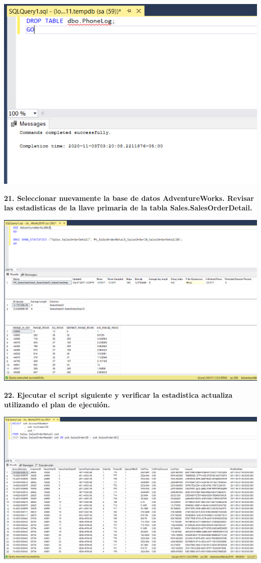 \documentclass{article}
\begin{document}
    \begin{center}
		\includegraphics[width=15cm]{./images/24} 
	\end{center}
\newpage
\textbf{21. Seleccionar nuevamente la base de datos AdventureWorks. Revisar las estadisticas de la llave primaria de la tabla Sales.SalesOrderDetail.}

    \begin{center}
		\includegraphics[width=15cm]{./images/25} 
	\end{center}
\newpage
\textbf{22. Ejecutar el script siguiente y verificar la estadistica actualiza utilizando el plan de ejecuión.}

    \begin{center}
		\includegraphics[width=15cm]{./images/26} 
	\end{center}

   
\end{document}
